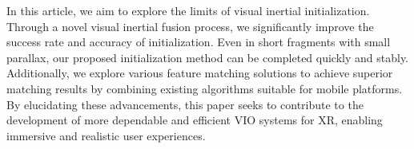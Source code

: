 In this article, we aim to explore the limits of visual inertial initialization. Through a novel visual inertial fusion process, we significantly improve the success rate and accuracy of initialization. Even in short fragments with small parallax, our proposed initialization method can be completed quickly and stably. 
Additionally, we explore various feature matching solutions to achieve superior matching results by combining existing algorithms suitable for mobile platforms. 
By elucidating these advancements, this paper seeks to contribute to the development of more dependable and efficient VIO systems for XR, enabling immersive and realistic user experiences.

